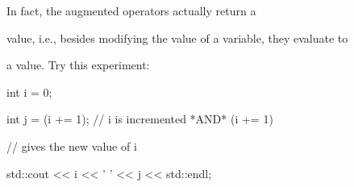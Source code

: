  In fact, the augmented operators actually return a

value, i.e., besides modifying the value of a variable, they evaluate to

a value. Try this experiment:

\begin{console}

int i = 0;

int j = (i += 1); // i is incremented *AND* (i += 1)

// gives the new value of i

std::cout << i << ' ' << j << std::endl;

\end{console}

